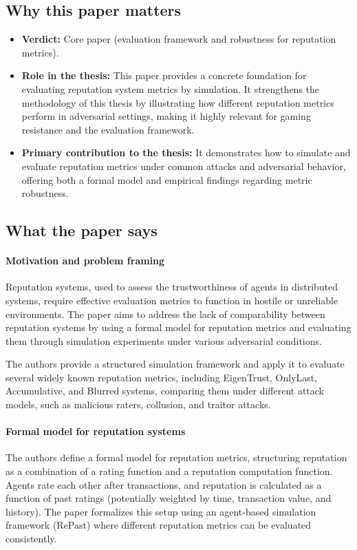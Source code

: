 \documentclass[11pt,a4paper]{article}
\begin{document}
\subsection{Why this paper matters}
\begin{itemize}[leftmargin=*]
  \item \textbf{Verdict:} Core paper (evaluation framework and robustness for reputation metrics).
  \item \textbf{Role in the thesis:} This paper provides a concrete foundation for evaluating reputation system metrics by simulation. It strengthens the methodology of this thesis by illustrating how different reputation metrics perform in adversarial settings, making it highly relevant for gaming resistance and the evaluation framework.
  \item \textbf{Primary contribution to the thesis:} It demonstrates how to simulate and evaluate reputation metrics under common attacks and adversarial behavior, offering both a formal model and empirical findings regarding metric robustness.
\end{itemize}

\subsection{What the paper says}
\paragraph{Motivation and problem framing}
Reputation systems, used to assess the trustworthiness of agents in distributed systems, require effective evaluation metrics to function in hostile or unreliable environments. The paper aims to address the lack of comparability between reputation systems by using a formal model for reputation metrics and evaluating them through simulation experiments under various adversarial conditions.

The authors provide a structured simulation framework and apply it to evaluate several widely known reputation metrics, including EigenTrust, OnlyLast, Accumulative, and Blurred systems, comparing them under different attack models, such as malicious raters, collusion, and traitor attacks.

\paragraph{Formal model for reputation systems}
The authors define a formal model for reputation metrics, structuring reputation as a combination of a rating function and a reputation computation function. Agents rate each other after transactions, and reputation is calculated as a function of past ratings (potentially weighted by time, transaction value, and history). The paper formalizes this setup using an agent-based simulation framework (RePast) where different reputation metrics can be evaluated consistently.
\end{document}
